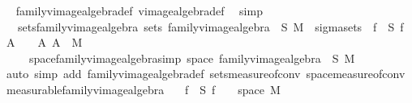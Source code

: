 \begin{isabellebody}
\ %
\endisadelimproof
%
\isatagproof
{}\isamarkupfalse%
\ family{\isacharunderscore}{\kern0pt}vimage{\isacharunderscore}{\kern0pt}algebra{\isacharunderscore}{\kern0pt}def\ vimage{\isacharunderscore}{\kern0pt}algebra{\isacharunderscore}{\kern0pt}def\ \isamarkupfalse%
\ simp%
\endisatagproof
{\isafoldproof}%
%
\isadelimproof
%
\endisadelimproof
\isanewline
\isanewline
{}\isamarkupfalse%
\isanewline
\ \ \ sets{\isacharunderscore}{\kern0pt}family{\isacharunderscore}{\kern0pt}vimage{\isacharunderscore}{\kern0pt}algebra{\isacharcolon}{\kern0pt}\ {\isachardoublequoteopen}sets\ {\isacharparenleft}{\kern0pt}family{\isacharunderscore}{\kern0pt}vimage{\isacharunderscore}{\kern0pt}algebra\ {\isasymOmega}\ S\ M{\isacharparenright}{\kern0pt}\ {\isacharequal}{\kern0pt}\ sigma{\isacharunderscore}{\kern0pt}sets\ {\isasymOmega}\ {\isacharparenleft}{\kern0pt}{\isasymUnion}f\ {\isasymin}\ S{\isachardot}{\kern0pt}\ {\isacharbraceleft}{\kern0pt}f\ {\isacharminus}{\kern0pt}{\isacharbackquote}{\kern0pt}\ A\ {\isasyminter}\ {\isasymOmega}\ {\isacharbar}{\kern0pt}\ A{\isachardot}{\kern0pt}\ A\ {\isasymin}\ M{\isacharbraceright}{\kern0pt}{\isacharparenright}{\kern0pt}{\isachardoublequoteclose}\ \isanewline
\ \ \ \ \ space{\isacharunderscore}{\kern0pt}family{\isacharunderscore}{\kern0pt}vimage{\isacharunderscore}{\kern0pt}algebra{\isacharbrackleft}{\kern0pt}simp{\isacharbrackright}{\kern0pt}{\isacharcolon}{\kern0pt}\ {\isachardoublequoteopen}space\ {\isacharparenleft}{\kern0pt}family{\isacharunderscore}{\kern0pt}vimage{\isacharunderscore}{\kern0pt}algebra\ {\isasymOmega}\ S\ M{\isacharparenright}{\kern0pt}\ {\isacharequal}{\kern0pt}\ {\isasymOmega}{\isachardoublequoteclose}\isanewline
%
\isadelimproof
\ \ %
\endisadelimproof
%
\isatagproof
{}\isamarkupfalse%
\ {\isacharparenleft}{\kern0pt}auto\ simp\ add{\isacharcolon}{\kern0pt}\ family{\isacharunderscore}{\kern0pt}vimage{\isacharunderscore}{\kern0pt}algebra{\isacharunderscore}{\kern0pt}def\ sets{\isacharunderscore}{\kern0pt}measure{\isacharunderscore}{\kern0pt}of{\isacharunderscore}{\kern0pt}conv\ space{\isacharunderscore}{\kern0pt}measure{\isacharunderscore}{\kern0pt}of{\isacharunderscore}{\kern0pt}conv{\isacharparenright}{\kern0pt}%
\endisatagproof
{\isafoldproof}%
%
\isadelimproof
\isanewline
%
\endisadelimproof
\isanewline
{}\isamarkupfalse%
\ measurable{\isacharunderscore}{\kern0pt}family{\isacharunderscore}{\kern0pt}vimage{\isacharunderscore}{\kern0pt}algebra{\isacharcolon}{\kern0pt}\isanewline
\ \ \ {\isachardoublequoteopen}f\ {\isasymin}\ S{\isachardoublequoteclose}\ {\isachardoublequoteopen}f\ {\isasymin}\ {\isasymOmega}\ {\isasymrightarrow}\ space\ M{\isachardoublequoteclose}\isanewline

\end{isabellebody}
